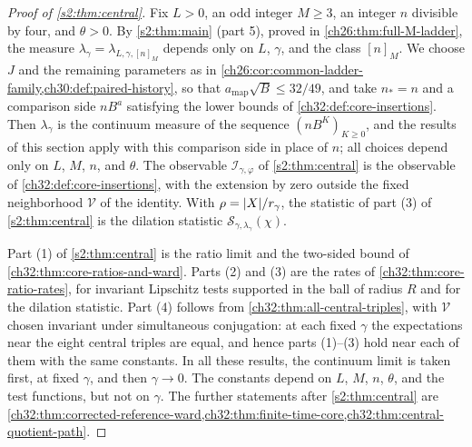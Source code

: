 \begin{proof}[Proof of \cref{s2:thm:central}]
Fix $L>0$, an odd integer $M\ge3$, an integer $n$ divisible by four, and $\theta>0$. By \cref{s2:thm:main} (part 5), proved in \cref{ch26:thm:full-M-ladder}, the measure $\lambda_\gamma=\lambda_{L,\gamma,[n]_M}$ depends only on $L$, $\gamma$, and the class $[n]_M$. We choose $J$ and the remaining parameters as in \cref{ch26:cor:common-ladder-family,ch30:def:paired-history}, so that $a_{\mathrm{map}}\sqrt B\le32/49$, and take $n_*=n$ and a comparison side $nB^{a}$ satisfying the lower bounds of \cref{ch32:def:core-insertions}. Then $\lambda_\gamma$ is the continuum measure of the sequence $(nB^K)_{K\ge0}$, and the results of this section apply with this comparison side in place of $n$; all choices depend only on $L$, $M$, $n$, and $\theta$. The observable $\mathcal I_{\gamma,\varphi}$ of \cref{s2:thm:central} is the observable of \cref{ch32:def:core-insertions}, with the extension by zero outside the fixed neighborhood $\mathcal V$ of the identity. With $\rho=\lvert X\rvert/r_\gamma$, the statistic of part (3) of \cref{s2:thm:central} is the dilation statistic $\mathcal S_{\gamma,\lambda_\gamma}(\chi)$.

Part (1) of \cref{s2:thm:central} is the ratio limit and the two-sided bound of \cref{ch32:thm:core-ratios-and-ward}. Parts (2) and (3) are the rates of \cref{ch32:thm:core-ratio-rates}, for invariant Lipschitz tests supported in the ball of radius $R$ and for the dilation statistic. Part (4) follows from \cref{ch32:thm:all-central-triples}, with $\mathcal V$ chosen invariant under simultaneous conjugation: at each fixed $\gamma$ the expectations near the eight central triples are equal, and hence parts (1)--(3) hold near each of them with the same constants. In all these results, the continuum limit is taken first, at fixed $\gamma$, and then $\gamma\to0$. The constants depend on $L$, $M$, $n$, $\theta$, and the test functions, but not on $\gamma$. The further statements after \cref{s2:thm:central} are \cref{ch32:thm:corrected-reference-ward,ch32:thm:finite-time-core,ch32:thm:central-quotient-path}.
\end{proof}
